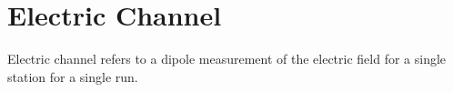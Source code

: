 \documentclass{article}
\begin{document}
%
%

\newpage
\section{Electric Channel}

Electric channel refers to a dipole measurement of the electric field for a single station for a single run.   
 
\end{document}
